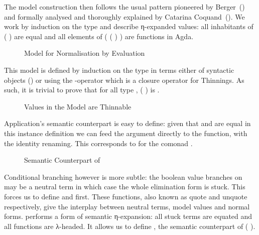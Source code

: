 The model construction then follows the usual pattern pioneered by
Berger~(\citeyear{berger1993program}) and formally analysed and thoroughly
explained by Catarina Coquand~(\citeyear{coquand2002formalised}). We work
by induction on the type and describe η-expanded values: all inhabitants
of (  ) are equal and all elements
of ( (  ) ) are functions in Agda.

\begin{figure}[h]
\caption{Model for Normalisation by Evaluation\label{fig:nbemodel}}
\end{figure}

This model is defined by induction on the type in terms either of
syntactic objects () or using the -operator which is
a closure operator for Thinnings. As such, it is trivial to prove
that for all type , ( ) is .

\begin{figure}[h]
\caption{Values in the Model are Thinnable\label{fig:thnbemodel}}
\end{figure}

Application's semantic counterpart is easy to define: given that 
and  are equal in this instance definition we can feed the argument
directly to the function, with the identity renaming. This corresponds to
 for the comonad .

\begin{figure}[h]
\caption{Semantic Counterpart of \label{fig:nbeapp}}
\end{figure}

Conditional branching however is more subtle: the boolean value  branches on
may be a neutral term in which case the whole elimination form is stuck. This forces
us to define  and  first. These functions, also known as quote
and unquote respectively, give the interplay between neutral terms, model values and
normal forms.  performs a form of semantic η-expansion: all stuck 
terms are equated and all functions are λ-headed. It allows us to define , the
semantic counterpart of ( ).

